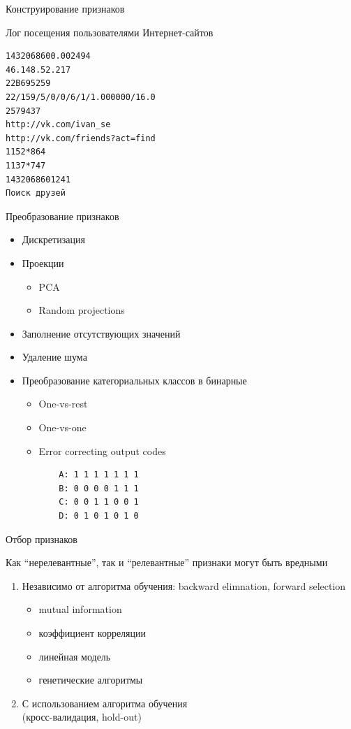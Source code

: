 \documentclass[10pt]{beamer}
\begin{document}
\begin{frame}[fragile]{Конструирование признаков}

Лог посещения пользователями Интернет-сайтов
\begin{verbatim}
1432068600.002494
46.148.52.217
22B695259
22/159/5/0/0/6/1/1.000000/16.0
2579437
http://vk.com/ivan_se
http://vk.com/friends?act=find
1152*864 
1137*747
1432068601241
Поиск друзей
\end{verbatim}

\end{frame}

\begin{frame}[fragile]{Преобразование признаков}

\begin{itemize}
\item Дискретизация
\item Проекции
	\begin{itemize}
	\item PCA
	\item Random projections
	\end{itemize}
\item Заполнение отсутствующих значений
\item Удаление шума
\item Преобразование категориальных классов в бинарные
	\begin{itemize}
	\item One-vs-rest
	\item One-vs-one
	\item Error correcting output codes
	\begin{verbatim}
	A: 1 1 1 1 1 1 1
	B: 0 0 0 0 1 1 1
	C: 0 0 1 1 0 0 1
	D: 0 1 0 1 0 1 0
	\end{verbatim}
	\end{itemize}
\end{itemize}

\end{frame}

\begin{frame}{Отбор признаков}

Как ``нерелевантные'', так и ``релевантные'' признаки могут быть вредными

\begin{enumerate}
\item Независимо от алгоритма обучения: backward elimnation, forward selection
	\begin{itemize}	
	\item mutual information	
	\item коэффициент корреляции
	\item линейная модель
	\item генетические алгоритмы
	\end{itemize}
\item С использованием алгоритма обучения \\ (кросс-валидация, hold-out)
\end{enumerate}

\end{frame}
\end{document}
